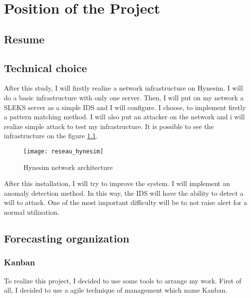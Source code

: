 
\chapter{Position of the Project}
\label{chap:project}


\section{Resume}

\section{Technical choice}

After this study, I will firstly realize a network infrastructure on Hynesim. I
will do a basic infrastructure with only one server. Then, I will put on my
network a SLEKS server as a simple IDS and I will configure. I choose, to
implement firstly a pattern matching method. I will also put an attacker on the
network and i will realize simple attack to test my infrastructure. It is
possible to see the infrastructure on the figure \ref{fig:network_hynesim}.

\begin{figure}[h]
  \centering
  \texttt{[image: reseau\_hynesim]}
  \caption{Hynesim network architecture}
  \label{fig:network_hynesim}
\end{figure}

After this installation, I will try to improve the system. I will implement an
anomaly detection method. In this way, the IDS will have the ability to detect a
will to attack. One of the most important difficulty will be to not raise alert
for a normal utilization.

\section{Forecasting organization}

\subsection{Kanban}

To realize this project, I decided to use some tools to arrange my work. First
of all, I decided to use a agile technique of management which name Kanban.~\\




